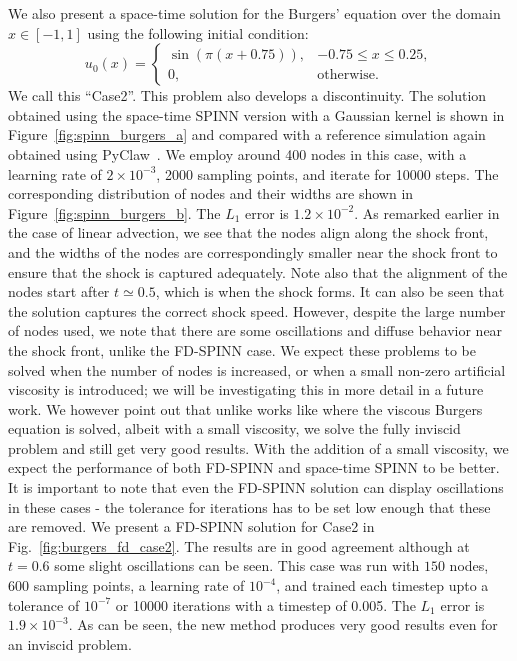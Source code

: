 \documentclass[12pt]{article}
\newcommand{\rr}[1]{#1}
\newcommand{\rb}[1]{#1}
\newcommand{\rR}[1]{#1}
\begin{document}
We also present a space-time solution for the Burgers' equation over the domain $x \in [-1, 1]$ using the following initial condition:
\begin{displaymath}
u_0(x) = \begin{cases}
\sin(\pi(x + 0.75)), & -0.75 \le x \le 0.25,\\
0, & \text{otherwise}.
\end{cases}
\end{displaymath}
\rb{We call this ``Case2''.} This problem also develops a discontinuity. The solution obtained using the space-time SPINN version with a Gaussian kernel is shown in Figure~\ref{fig:spinn_burgers_a} and compared with a reference simulation again obtained using PyClaw~\cite{pyclaw}. \rb{We employ around 400 nodes in this case, with a learning rate of $2\times 10^{-3}$, 2000 sampling points, and iterate for 10000 steps.} The corresponding distribution of nodes and their widths are shown in Figure~\ref{fig:spinn_burgers_b}. \rR{The $L_1$ error is $1.2 \times 10^{-2}$.} As remarked earlier in the case of linear advection, we see that the nodes align along the shock front, and the widths of the nodes are correspondingly smaller near the shock front to ensure that the shock is captured adequately. Note also that the alignment of the nodes start after $t \simeq 0.5$, which is when the shock forms. It can also be seen that the solution captures the correct shock speed. However, despite the large number of nodes used, we note that there are some oscillations and diffuse behavior near the shock front, unlike the FD-SPINN case. We expect these problems to be solved when the number of nodes is increased, or when a small non-zero artificial viscosity is introduced; we will be investigating this in more detail in a future work. \rr{We however point out that unlike works like \cite{RPK2019} where the viscous Burgers equation is solved, albeit with a small viscosity, we solve the fully inviscid problem and still get very good results. With the addition of a small viscosity, we expect the performance of both FD-SPINN and space-time SPINN to be better.} \rb{It is important to note that even the FD-SPINN solution can display oscillations in these cases - the tolerance for iterations has to be set low enough that these are removed.  We present a FD-SPINN solution for Case2 in Fig.~\ref{fig:burgers_fd_case2}.  The results are in good agreement although at $t=0.6$ some slight oscillations can be seen.  This case was run with $150$ nodes, $600$ sampling points, a learning rate of $10^{-4}$, and trained each timestep upto a tolerance of $10^{-7}$ or 10000 iterations with a timestep of 0.005.}  \rR{The $L_1$ error is $1.9 \times 10^{-3}.$} \rb{As can be seen, the new method produces very good results even for an inviscid problem.}
\end{document}
